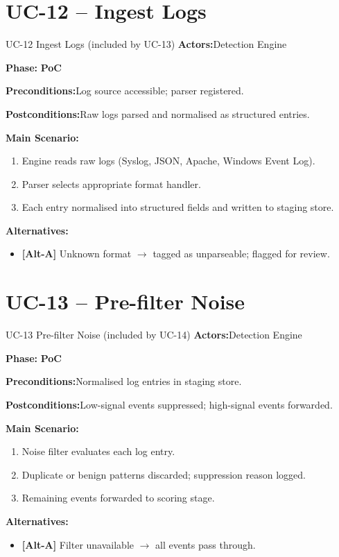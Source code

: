 \documentclass[12pt,a4paper]{report}
\newcommand{\ucfield}[2]{%
    \noindent\textbf{\color{helixpurplemid}#1:}\quad #2\par\medskip
}
\newcommand{\ucphase}[1]{%
    \noindent\textbf{\color{helixpurplemid}Phase:}\quad%
    \ifstrequal{#1}{PoC}{\textcolor{helixteal}{\textbf{PoC}}}{\textcolor{helixamber}{\textbf{Future MVP}}}%
    \par\medskip
}
\begin{document}
\section{UC-12 -- Ingest Logs}
\begin{ucbox}{UC-12 \quad Ingest Logs \textnormal{(included by UC-13)}}
    \ucfield{Actors}{Detection Engine}
    \ucphase{PoC}
    \ucfield{Preconditions}{Log source accessible; parser registered.}
    \ucfield{Postconditions}{Raw logs parsed and normalised as structured entries.}
    \textbf{\color{helixpurplemid}Main Scenario:}
    \begin{enumerate}
        \item Engine reads raw logs (Syslog, JSON, Apache, Windows Event Log).
        \item Parser selects appropriate format handler.
        \item Each entry normalised into structured fields and written to staging store.
    \end{enumerate}
    \textbf{\color{helixpurplemid}Alternatives:}
    \begin{itemize}
        \item \textbf{[Alt-A]} Unknown format $\rightarrow$ tagged as unparseable; flagged for review.
    \end{itemize}
\end{ucbox}

\section{UC-13 -- Pre-filter Noise}
\begin{ucbox}{UC-13 \quad Pre-filter Noise \textnormal{(included by UC-14)}}
    \ucfield{Actors}{Detection Engine}
    \ucphase{PoC}
    \ucfield{Preconditions}{Normalised log entries in staging store.}
    \ucfield{Postconditions}{Low-signal events suppressed; high-signal events forwarded.}
    \textbf{\color{helixpurplemid}Main Scenario:}
    \begin{enumerate}
        \item Noise filter evaluates each log entry.
        \item Duplicate or benign patterns discarded; suppression reason logged.
        \item Remaining events forwarded to scoring stage.
    \end{enumerate}
    \textbf{\color{helixpurplemid}Alternatives:}
    \begin{itemize}
        \item \textbf{[Alt-A]} Filter unavailable $\rightarrow$ all events pass through.
    \end{itemize}
\end{ucbox}
\end{document}
